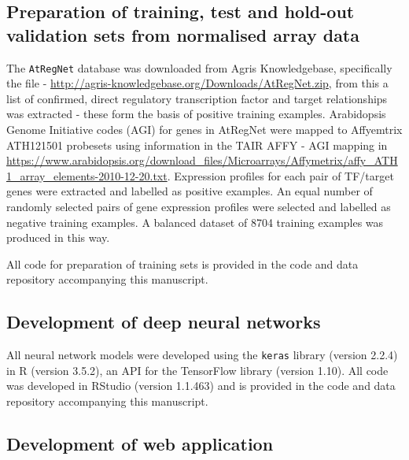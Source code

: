 \documentclass[12pt,a4paper,]{article}
\begin{document}
\hypertarget{preparation-of-training-test-and-hold-out-validation-sets-from-normalised-array-data}{%
\subsection{Preparation of training, test and hold-out validation sets from normalised array data}\label{preparation-of-training-test-and-hold-out-validation-sets-from-normalised-array-data}}

The \texttt{AtRegNet} database was downloaded from Agris Knowledgebase, specifically the file - \href{}{http://agris-knowledgebase.org/Downloads/AtRegNet.zip}, from this a list of confirmed, direct regulatory transcription factor and target relationships was extracted - these form the basis of positive training examples. Arabidopsis Genome Initiative codes (AGI) for genes in AtRegNet were mapped to Affyemtrix ATH121501 probesets using information in the TAIR AFFY - AGI mapping in \href{}{https://www.arabidopsis.org/download\_files/Microarrays/Affymetrix/affy\_ATH1\_array\_elements-2010-12-20.txt}. Expression profiles for each pair of TF/target genes were extracted and labelled as positive examples. An equal number of randomly selected pairs of gene expression profiles were selected and labelled as negative training examples. A balanced dataset of 8704 training examples was produced in this way.

All code for preparation of training sets is provided in the code and data repository accompanying this manuscript.

\hypertarget{development-of-deep-neural-networks}{%
\subsection{Development of deep neural networks}\label{development-of-deep-neural-networks}}

All neural network models were developed using the \texttt{keras} library (version 2.2.4) in R (version 3.5.2), an API for the TensorFlow library (version 1.10). All code was developed in RStudio (version 1.1.463) and is provided in the code and data repository accompanying this manuscript.

\hypertarget{development-of-web-application}{%
\subsection{Development of web application}\label{development-of-web-application}}
\end{document}
